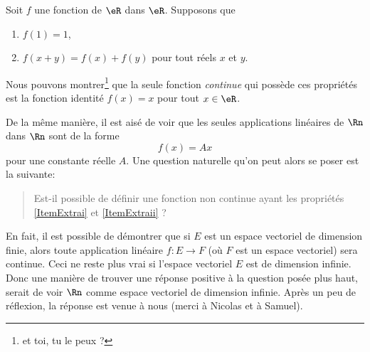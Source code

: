Soit $f$ une fonction de $\eR$ dans $\eR$. Supposons que 
\begin{enumerate}

\item		\label{ItemExtrai}
$f(1)=1$,

\item		\label{ItemExtraii}
$f(x+y)=f(x)+f(y)$ pour tout réels $x$ et $y$.

\end{enumerate}
Nous pouvons montrer\footnote{et toi, tu le peux ?} que la seule fonction {\it continue} qui possède ces propriétés est la fonction identité $f(x)=x$ pour tout $x\in\eR$.

De la même manière, il est aisé de voir que les seules applications linéaires de $\Rn$ dans $\Rn$ sont de la forme 
\begin{equation}
	f(x)=Ax
\end{equation}
pour une constante réelle $A$. Une question naturelle qu'on peut alors se poser est la suivante: 
\begin{quote} 
	Est-il possible de définir une fonction non continue ayant les propriétés \ref{ItemExtrai} et \ref{ItemExtraii} ?
\end{quote}
En fait, il est possible de démontrer que si $E$ est un espace vectoriel de dimension finie, alors toute application linéaire $f:E\rightarrow  F$ (où $F$ est un espace vectoriel) sera continue. Ceci ne reste plus vrai si l'espace vectoriel $E$ est de dimension infinie. Donc une manière de trouver une réponse positive à la question posée plus haut, serait de voir $\Rn$ comme espace vectoriel de dimension infinie. Après un peu de réflexion, la réponse est venue à nous (merci à Nicolas et à Samuel). 




